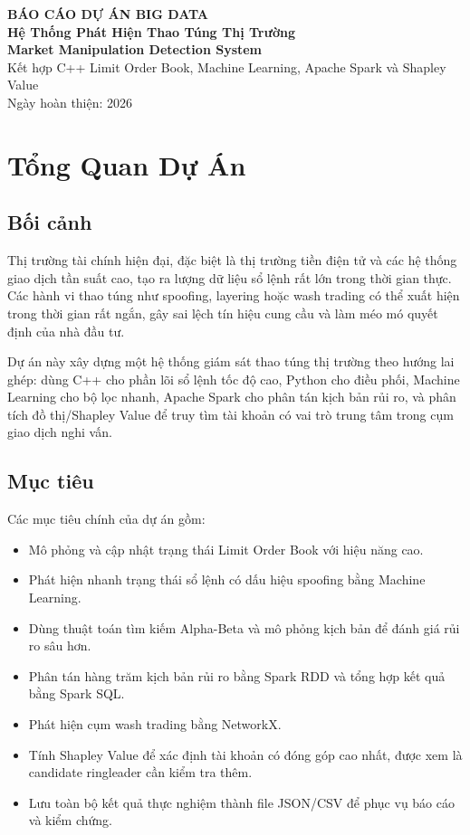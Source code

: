 \documentclass[12pt,a4paper]{report}
\begin{document}
\begin{titlepage}
    \centering
    {\Large \textbf{BÁO CÁO DỰ ÁN BIG DATA}}\\[1.5cm]
    {\Huge \textbf{Hệ Thống Phát Hiện Thao Túng Thị Trường}}\\[0.4cm]
    {\Large \textbf{Market Manipulation Detection System}}\\[1.2cm]
    {\large Kết hợp C++ Limit Order Book, Machine Learning, Apache Spark và Shapley Value}\\[2cm]
    \vfill
    {\large Ngày hoàn thiện: 2026}\\[0.5cm]
\end{titlepage}

\tableofcontents
\newpage

\chapter{Tổng Quan Dự Án}

\section{Bối cảnh}

Thị trường tài chính hiện đại, đặc biệt là thị trường tiền điện tử và các hệ thống giao dịch tần suất cao, tạo ra lượng dữ liệu sổ lệnh rất lớn trong thời gian thực. Các hành vi thao túng như spoofing, layering hoặc wash trading có thể xuất hiện trong thời gian rất ngắn, gây sai lệch tín hiệu cung cầu và làm méo mó quyết định của nhà đầu tư.

Dự án này xây dựng một hệ thống giám sát thao túng thị trường theo hướng lai ghép: dùng C++ cho phần lõi sổ lệnh tốc độ cao, Python cho điều phối, Machine Learning cho bộ lọc nhanh, Apache Spark cho phân tán kịch bản rủi ro, và phân tích đồ thị/Shapley Value để truy tìm tài khoản có vai trò trung tâm trong cụm giao dịch nghi vấn.

\section{Mục tiêu}

Các mục tiêu chính của dự án gồm:

\begin{itemize}
    \item Mô phỏng và cập nhật trạng thái Limit Order Book với hiệu năng cao.
    \item Phát hiện nhanh trạng thái sổ lệnh có dấu hiệu spoofing bằng Machine Learning.
    \item Dùng thuật toán tìm kiếm Alpha-Beta và mô phỏng kịch bản để đánh giá rủi ro sâu hơn.
    \item Phân tán hàng trăm kịch bản rủi ro bằng Spark RDD và tổng hợp kết quả bằng Spark SQL.
    \item Phát hiện cụm wash trading bằng NetworkX.
    \item Tính Shapley Value để xác định tài khoản có đóng góp cao nhất, được xem là candidate ringleader cần kiểm tra thêm.
    \item Lưu toàn bộ kết quả thực nghiệm thành file JSON/CSV để phục vụ báo cáo và kiểm chứng.
\end{itemize}
\end{document}
